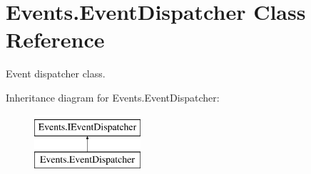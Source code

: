\hypertarget{class_events_1_1_event_dispatcher}{}\section{Events.\+Event\+Dispatcher Class Reference}
\label{class_events_1_1_event_dispatcher}


Event dispatcher class.  


Inheritance diagram for Events.\+Event\+Dispatcher\+:\begin{figure}[H]
\begin{center}
\leavevmode
\includegraphics[height=2.000000cm]{class_events_1_1_event_dispatcher}
\end{center}
\end{figure}
